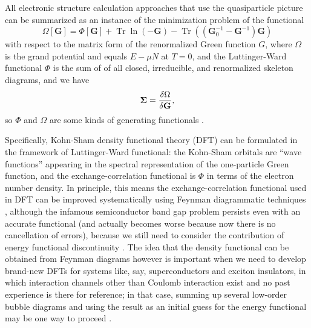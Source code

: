 \documentclass[hyperref, a4paper]{article}
\begin{document}
All electronic structure calculation approaches that use the quasiparticle picture 
can be summarized as an instance of the minimization problem 
of the functional 
\begin{equation}
    \Omega[\mathbf{G}]= \Phi[\mathbf{G}]+\operatorname{Tr} \ln (-\mathbf{G})-\operatorname{Tr}\left(\left(\mathbf{G}_0^{-1}-\mathbf{G}^{-1}\right) \mathbf{G}\right)
\end{equation}
with respect to the matrix form of the renormalized Green function $G$,
where $\Omega$ is the grand potential
and equals $E - \mu N$ at $T = 0$, 
and the Luttinger-Ward functional $\Phi$ 
is the sum of of all closed, irreducible, and renormalized skeleton diagrams,
and we have 
\begin{equation}
    \mathbf{\Sigma} = \fdv{\Omega}{\mathbf{G}}, 
\end{equation}
so $\Phi$ and $\Omega$ are some kinds of generating functionals
\cite{PhysRev.118.1417,potthoff2003self}.

Specifically, Kohn-Sham density functional theory (DFT) 
can be formulated in the framework of Luttinger-Ward functional: 
the Kohn-Sham orbitals are ``wave functions'' 
appearing in the spectral representation of the one-particle Green function,
and the exchange-correlation functional 
is $\Phi$ in terms of the electron number density.
In principle, 
this means the exchange-correlation functional used in DFT
can be improved systematically using Feynman diagrammatic techniques
\cite{aryasetiawan2002total,gruning2006density,haule2015free},
although the infamous semiconductor band gap problem
persists even with an accurate functional
(and actually becomes worse because now there is no cancellation of errors),
because we still need to consider the contribution of 
energy functional discontinuity
\cite{gruning2006density}.
The idea that the density functional can be obtained from Feynman diagrams 
however is important when we need to develop 
brand-new DFTs for systems like, say, 
superconductors and exciton insulators,
in which interaction channels other than Coulomb interaction exist 
and no past experience is there for reference;
in that case, 
summing up several low-order bubble diagrams 
and using the result as an initial guess for the energy functional 
may be one way to proceed \cite{kurth1999local,chen2022development}.
\end{document}
